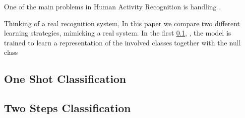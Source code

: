 One of the main problems in Human Activity Recognition is handling .

Thinking of a real recognition system, 
In this paper we compare two different learning strategies, mimicking a real system. In the first \ref{sub:oneshot}, , the model is trained to learn a representation of the involved classes together with the null class

\subsection{One Shot Classification}
\label{sub:oneshot}

\subsection{Two Steps Classification}
\label{sub:twosteps}